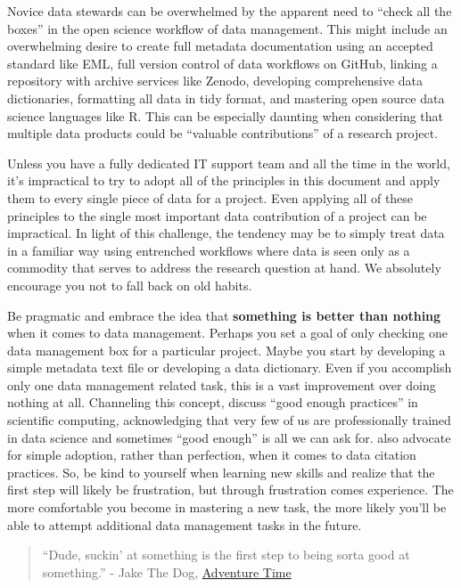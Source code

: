 \documentclass[
]{book}
\begin{document}
Novice data stewards can be overwhelmed by the apparent need to ``check all the boxes'' in the open science workflow of data management. This might include an overwhelming desire to create full metadata documentation using an accepted standard like EML, full version control of data workflows on GitHub, linking a repository with archive services like Zenodo, developing comprehensive data dictionaries, formatting all data in tidy format, and mastering open source data science languages like R. This can be especially daunting when considering that multiple data products could be ``valuable contributions'' of a research project.

Unless you have a fully dedicated IT support team and all the time in the world, it's impractical to try to adopt all of the principles in this document and apply them to every single piece of data for a project. Even applying all of these principles to the single most important data contribution of a project can be impractical. In light of this challenge, the tendency may be to simply treat data in a familiar way using entrenched workflows where data is seen only as a commodity that serves to address the research question at hand. We absolutely encourage you not to fall back on old habits.

Be pragmatic and embrace the idea that \textbf{something is better than nothing} when it comes to data management. Perhaps you set a goal of only checking one data management box for a particular project. Maybe you start by developing a simple metadata text file or developing a data dictionary. Even if you accomplish only one data management related task, this is a vast improvement over doing nothing at all. Channeling this concept, \citet{Wilson17} discuss ``good enough practices'' in scientific computing, acknowledging that very few of us are professionally trained in data science and sometimes ``good enough'' is all we can ask for. \citet{Lowenberg21} also advocate for simple adoption, rather than perfection, when it comes to data citation practices. So, be kind to yourself when learning new skills and realize that the first step will likely be frustration, but through frustration comes experience. The more comfortable you become in mastering a new task, the more likely you'll be able to attempt additional data management tasks in the future.

\begin{quote}
``Dude, suckin' at something is the first step to being sorta good at something.'' - Jake The Dog, \href{https://en.wikipedia.org/wiki/Adventure_Time}{Adventure Time}
\end{quote}
\end{document}
